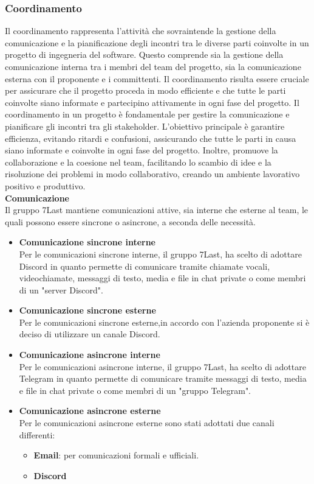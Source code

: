 \subsubsection{Coordinamento}
Il coordinamento rappresenta l’attività che sovraintende la gestione della comunicazione e la pianificazione degli incontri tra le diverse parti coinvolte in un progetto di ingegneria del software. Questo comprende sia la gestione della comunicazione interna tra i membri del team del progetto, sia la comunicazione esterna con il proponente e i committenti. Il coordinamento risulta essere cruciale per assicurare che il progetto proceda in modo efficiente e che tutte le parti coinvolte siano informate e partecipino attivamente in ogni fase del progetto.
Il coordinamento in un progetto è fondamentale per gestire la comunicazione e pianificare gli incontri tra gli stakeholder. L’obiettivo principale è garantire efficienza, evitando ritardi e confusioni, assicurando che tutte le parti in causa siano informate e coinvolte in ogni fase del progetto. Inoltre, promuove la collaborazione e la coesione nel team, facilitando lo scambio di idee e la risoluzione dei problemi in modo collaborativo, creando un ambiente lavorativo positivo e produttivo.\\
\textbf{Comunicazione}\\
Il gruppo 7Last mantiene comunicazioni attive, sia interne che esterne al team, le quali possono essere sincrone o asincrone, a seconda delle necessità.
\begin{itemize}
    \item \textbf{Comunicazione sincrone interne}\\Per le comunicazioni sincrone interne, il gruppo 7Last, ha scelto di adottare Discord in quanto permette di comunicare tramite chiamate vocali, videochiamate, messaggi di testo, media e file in chat private o come membri di un "server Discord".
    \item \textbf{Comunicazione sincrone esterne}\\Per le comunicazioni sincrone esterne,in accordo con l’azienda proponente si è deciso di utilizzare un canale Discord.
\end{itemize}
\begin{itemize}
    \item \textbf{Comunicazione asincrone interne}\\Per le comunicazioni asincrone interne, il gruppo 7Last, ha scelto di adottare Telegram in quanto permette di comunicare tramite messaggi di testo, media e file in chat private o come membri di un "gruppo Telegram".
    \item \textbf{Comunicazione asincrone esterne}\\Per le comunicazioni asincrone esterne sono stati adottati due canali differenti:
        \begin{itemize}
            \item \textbf{Email}: per comunicazioni formali e ufficiali.
            \item \textbf{Discord}
        \end{itemize}
\end{itemize}
